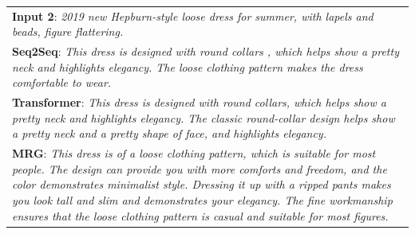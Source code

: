 \documentclass[letterpaper]{article} %
\begin{document}
\begin{table}[!t]
{\begin{tabular}{|p{1.00\linewidth}|}
    
    \textbf{Input 2}: \textsl{2019 new Hepburn-style loose dress for summer, with lapels and beads, figure flattering.}\\
      \textbf{Seq2Seq}:  \textsl{This dress is designed with round collars , which helps show a pretty neck and highlights elegancy. The loose clothing pattern makes the dress comfortable to wear.}    \\
      \textbf{Transformer}: \textsl{This dress is designed with round collars, which helps show a pretty neck and highlights elegancy. The classic round-collar design helps show a pretty neck and a pretty shape of face, and highlights elegancy.}\\
    \textbf{MRG}: \textsl{This dress is of a loose clothing pattern, which is suitable for most people. The design can provide you with more comforts and freedom, and the color demonstrates minimalist style. Dressing it up with a ripped pants makes you look tall and slim and demonstrates your elegancy. The fine workmanship ensures that the loose clothing pattern is casual and suitable for most figures.}\\ 

\end{tabular}}
\end{table}
\end{document}

